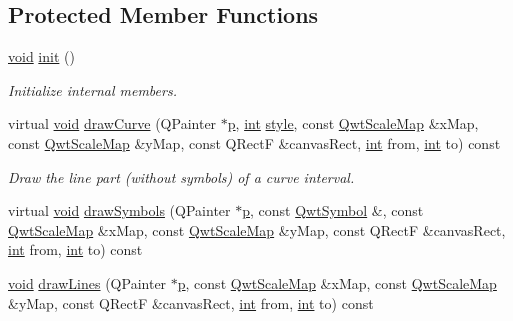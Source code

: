 \subsection*{Protected Member Functions}
\begin{DoxyCompactItemize}
\item 
\hyperlink{group___u_a_v_objects_plugin_ga444cf2ff3f0ecbe028adce838d373f5c}{void} \hyperlink{class_qwt_plot_curve_a7afecd61327d56ddc76687d119e92b5d}{init} ()
\begin{DoxyCompactList}\small\item\em Initialize internal members. \end{DoxyCompactList}\item 
virtual \hyperlink{group___u_a_v_objects_plugin_ga444cf2ff3f0ecbe028adce838d373f5c}{void} \hyperlink{class_qwt_plot_curve_a9a1188e6abab05ed66ee7aebfc3d3679}{draw\-Curve} (Q\-Painter $\ast$\hyperlink{glext_8h_aa5367c14d90f462230c2611b81b41d23}{p}, \hyperlink{ioapi_8h_a787fa3cf048117ba7123753c1e74fcd6}{int} \hyperlink{class_qwt_plot_curve_a2df43bdea2a17118c9114d6fa774e598}{style}, const \hyperlink{class_qwt_scale_map}{Qwt\-Scale\-Map} \&x\-Map, const \hyperlink{class_qwt_scale_map}{Qwt\-Scale\-Map} \&y\-Map, const Q\-Rect\-F \&canvas\-Rect, \hyperlink{ioapi_8h_a787fa3cf048117ba7123753c1e74fcd6}{int} from, \hyperlink{ioapi_8h_a787fa3cf048117ba7123753c1e74fcd6}{int} to) const 
\begin{DoxyCompactList}\small\item\em Draw the line part (without symbols) of a curve interval. \end{DoxyCompactList}\item 
virtual \hyperlink{group___u_a_v_objects_plugin_ga444cf2ff3f0ecbe028adce838d373f5c}{void} \hyperlink{class_qwt_plot_curve_ad734862538617112beb6a59cc06ed3b5}{draw\-Symbols} (Q\-Painter $\ast$\hyperlink{glext_8h_aa5367c14d90f462230c2611b81b41d23}{p}, const \hyperlink{class_qwt_symbol}{Qwt\-Symbol} \&, const \hyperlink{class_qwt_scale_map}{Qwt\-Scale\-Map} \&x\-Map, const \hyperlink{class_qwt_scale_map}{Qwt\-Scale\-Map} \&y\-Map, const Q\-Rect\-F \&canvas\-Rect, \hyperlink{ioapi_8h_a787fa3cf048117ba7123753c1e74fcd6}{int} from, \hyperlink{ioapi_8h_a787fa3cf048117ba7123753c1e74fcd6}{int} to) const 
\item 
\hyperlink{group___u_a_v_objects_plugin_ga444cf2ff3f0ecbe028adce838d373f5c}{void} \hyperlink{class_qwt_plot_curve_a20948ab52983ee8c2058b2b2689e97a0}{draw\-Lines} (Q\-Painter $\ast$\hyperlink{glext_8h_aa5367c14d90f462230c2611b81b41d23}{p}, const \hyperlink{class_qwt_scale_map}{Qwt\-Scale\-Map} \&x\-Map, const \hyperlink{class_qwt_scale_map}{Qwt\-Scale\-Map} \&y\-Map, const Q\-Rect\-F \&canvas\-Rect, \hyperlink{ioapi_8h_a787fa3cf048117ba7123753c1e74fcd6}{int} from, \hyperlink{ioapi_8h_a787fa3cf048117ba7123753c1e74fcd6}{int} to) const 

\end{DoxyCompactItemize}
